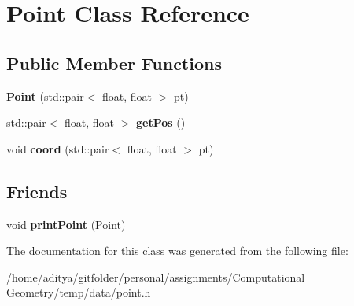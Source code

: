 \hypertarget{class_point}{}\section{Point Class Reference}
\label{class_point}
\subsection*{Public Member Functions}
\begin{DoxyCompactItemize}
\item 
\hypertarget{class_point_af0b2cb70572c7e1f7872e087fdecbf4d}{}{\bfseries Point} (std\+::pair$<$ float, float $>$ pt)\label{class_point_af0b2cb70572c7e1f7872e087fdecbf4d}

\item 
\hypertarget{class_point_a2b91c05552fe2434a281f9c8f92c3233}{}std\+::pair$<$ float, float $>$ {\bfseries get\+Pos} ()\label{class_point_a2b91c05552fe2434a281f9c8f92c3233}

\item 
\hypertarget{class_point_a597d780003619fa3e6a948f2b1acfac4}{}void {\bfseries coord} (std\+::pair$<$ float, float $>$ pt)\label{class_point_a597d780003619fa3e6a948f2b1acfac4}

\end{DoxyCompactItemize}
\subsection*{Friends}
\begin{DoxyCompactItemize}
\item 
\hypertarget{class_point_a001189c61243b0d13d0a69dc2b79f638}{}void {\bfseries print\+Point} (\hyperlink{class_point}{Point})\label{class_point_a001189c61243b0d13d0a69dc2b79f638}

\end{DoxyCompactItemize}


The documentation for this class was generated from the following file\+:\begin{DoxyCompactItemize}
\item 
/home/aditya/gitfolder/personal/assignments/\+Computational Geometry/temp/data/point.\+h\end{DoxyCompactItemize}
